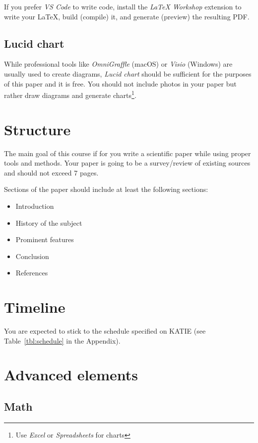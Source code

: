 \documentclass[11pt]{article}
\begin{document}
If you prefer \emph{VS Code} to write code, install the \emph{LaTeX Workshop} extension to write your \LaTeX, build (compile) it, and generate (preview) the resulting PDF.

\subsection{Lucid chart}

While professional tools like \emph{OmniGraffle} (macOS) or \emph{Visio} (Windows) are usually used to create diagrams, \emph{Lucid chart}\cite{LucidChart:online} should be sufficient for the purposes of this paper and it is free. You should not include photos in your paper but rather draw diagrams and generate charts\footnote{Use \emph{Excel} or \emph{Spreadsheets} for charts}.

\section{Structure}

The main goal of this course if for you write a scientific paper while using proper tools and methods. Your paper is going to be a survey/review of existing sources and should not exceed 7 pages.

Sections of the paper should include at least the following sections:

\begin{itemize}
    \item Introduction
    \item History of the subject
    \item Prominent features
    \item Conclusion
    \item References
\end{itemize}

\section{Timeline}

You are expected to stick to the schedule specified on KATIE (see Table~\ref{tbl:schedule} in the Appendix).

\section{Advanced elements}

\subsection{Math}
\end{document}
